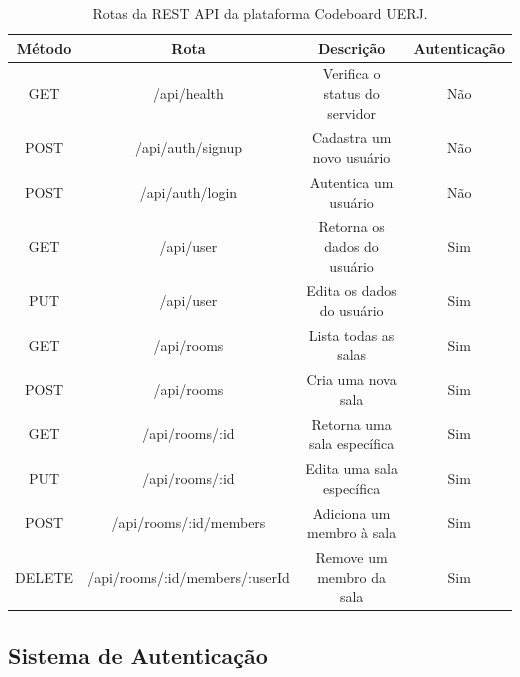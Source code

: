 \begin{table}[H]
    \centering
    \caption{Rotas da REST API da plataforma Codeboard UERJ.}
    \label{tab:rest-api-routes}
    \renewcommand{\arraystretch}{1.3} 
    \begin{tabular}{|c|c|c|c|}
        \hline
        \textbf{Método} & \textbf{Rota}                  & \textbf{Descrição}            & \textbf{Autenticação} \\
        \hline
        GET             & /api/health                    & Verifica o status do servidor & Não                   \\
        \hline
        POST            & /api/auth/signup               & Cadastra um novo usuário      & Não                   \\
        POST            & /api/auth/login                & Autentica um usuário          & Não                   \\
        \hline
        GET             & /api/user                      & Retorna os dados do usuário   & Sim                   \\
        PUT             & /api/user                      & Edita os dados do usuário     & Sim                   \\
        \hline
        GET             & /api/rooms                     & Lista todas as salas          & Sim                   \\
        POST            & /api/rooms                     & Cria uma nova sala            & Sim                   \\
        GET             & /api/rooms/:id                 & Retorna uma sala específica   & Sim                   \\
        PUT             & /api/rooms/:id                 & Edita uma sala específica     & Sim                   \\
        POST            & /api/rooms/:id/members         & Adiciona um membro à sala     & Sim                   \\
        DELETE          & /api/rooms/:id/members/:userId & Remove um membro da sala      & Sim                   \\
        \hline
    \end{tabular}
\end{table}


\subsection{Sistema de Autenticação}

